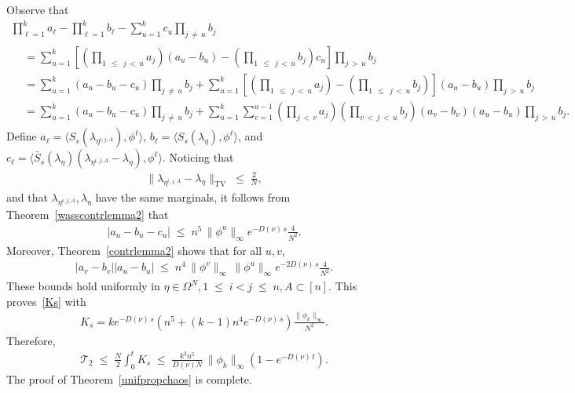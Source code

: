 \documentclass[AHL,Unicode,longabstracts,published]{cedram}
\renewcommand{\leq}{\;\leqslant\;}
\newcommand{\scalar}[2]{\langle #1, #2\rangle}
\newcommand{\tv}{\mathrm{TV}}
\newcommand{\cT}{\mathcal{T}}
\let\l=\lambda
\let\O=\Omega
\begin{document}
Observe that
\begin{multline}\label{eq:inpriaa3}
\prod_{\ell=1}^ka_\ell -\prod_{\ell=1}^kb_\ell - \sum_{u=1}^kc_u\prod_{j\,\neq\,u}b_j 
\\
\begin{aligned}
&= \sum_{u=1}^k\left[\left(\prod_{1\,\leq\,j \,<\,u}a_j\right)(a_u-b_u) - \left(\prod_{1 \,\leq\,j\,<\,u}b_j\right)c_u\right]\prod_{j\,>\,u}b_j\\
& = \sum_{u=1}^k(a_u-b_u-c_u)\prod_{j\,\neq\, u}b_j +
\sum_{u=1}^k\left[\left(\prod_{1\,\leq\,j\,< \,u}a_j\right) - \left(\prod_{1\,\leq\,j\,<\, u}b_j\right)\right](a_u-b_u)\prod_{j\,>\,u}b_j
\\
&= \sum_{u=1}^k(a_u-b_u-c_u)\prod_{j\,\neq\,u}b_j +
\sum_{u=1}^k\sum_{v=1}^{u-1}\left(\prod_{j\,< \,v}a_j\right)\left(\prod_{v\,<\,j\,<\,u}b_j\right)(a_v-b_v)(a_u-b_u)\prod_{j\,>\,u}b_j.
\end{aligned}
\end{multline}
Define $a_\ell = \scalar{S_s(\l_{\eta^{i,j,A}})}{\phi^\ell} $, $b_\ell=\scalar{S_s(\l_{\eta})}{\phi^\ell} $, and $c_\ell = \scalar{\bar S_s(\l_\eta)(\l_{\eta^{i,j,A}} -\l_{\eta})}{\phi^\ell}$. Noticing that
\begin{align}
\|\l_{\eta^{i,j,A}} -\l_{\eta}\|_\tv\leq \frac2N,
\end{align}
and that $\l_{\eta^{i,j,A}},\l_{\eta}$ have the same marginals, it follows from Theorem~\ref{wasscontrlemma2} that
\begin{align}\label{eq:abc1}
|a_u-b_u-c_u|\leq n^5\,\|\phi^u\|_\infty e^{-D(\nu)\, s} \frac{4}{N^2}.
\end{align}
Moreover, Theorem~\ref{contrlemma2} shows that for all $u,v$,
\begin{align}\label{eq:abc2}
|a_v-b_v||a_u-b_u|\leq n^4\,\|\phi^v\|_\infty\,\|\phi^u\|_\infty e^{-2D(\nu)\, s} \frac{4}{N^2}.
\end{align}
These bounds hold uniformly in $\eta\in\O^N,1\leq i<j\leq n,A\subset[n]$. This proves~\eqref{Ks} with
\begin{align}\label{eq:inprinc}
K_s =ke^{-D(\nu)\, s}\left(n^5 + (k-1)n^4e^{-D(\nu)\, s}\right) \frac{\|\phi_k\|_\infty }{N^2}.
\end{align}
Therefore,
\begin{align}\label{eq:inprinc2}
\cT_2\leq \frac{N}2\int_0^tK_s \leq \frac{k^2n^5}{D(\nu) N}\,\|\phi_k\|_\infty \left(1-e^{-D(\nu)\, t}\right).
\end{align}
The proof of Theorem~\ref{unifpropchaos} is complete.
\end{document}
